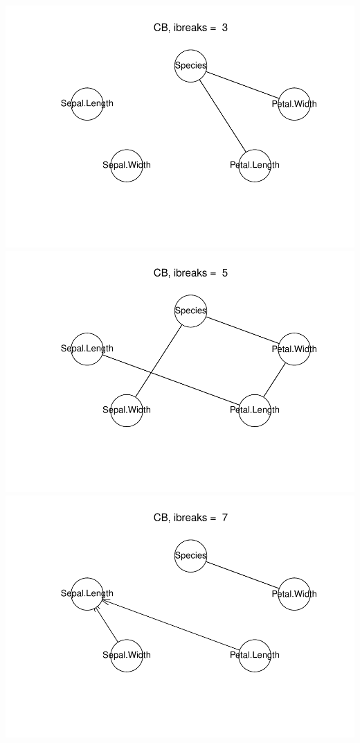 \documentclass[]{article}
\begin{document}
\includegraphics{BN_Ass2_files/figure-latex/unnamed-chunk-2-4.pdf}
\includegraphics{BN_Ass2_files/figure-latex/unnamed-chunk-2-5.pdf}
\includegraphics{BN_Ass2_files/figure-latex/unnamed-chunk-2-6.pdf}
\end{document}

